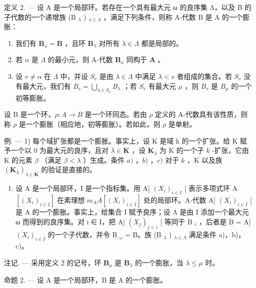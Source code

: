 定义 2. --- 设 A 是一个局部环。若存在一个具有最大元 ω 的良序集 Λ，以及 B 的子代数的一个递增族 (B \(_{λ}\) ) \(_{λ∈Λ}\) ，满足下列条件，则称 A-代数 B 是 A 的一个膨胀：

\begin{enumerate}
\def\labelenumi{\alph{enumi})}
\item
  我们有 \(\mathbf{B}_{\omega} = \mathbf{B}\) ，且环 \(\mathbf{B}_{\lambda}\) 对所有 \(\lambda \in \Lambda\) 都是局部的。
\item
  若 \(\alpha\) 是 \(\Lambda\) 的最小元，则 A-代数 \(\mathbf{B}_{\alpha}\) 同构于 \(\mathbf{A}\) 。
\item
  设 \(v \neq \alpha\) 在 \(\Lambda\) 中，并设 \(S_{v}\) 是由 \(\lambda \in \Lambda\) 中满足 \(\lambda < v\) 者组成的集合。若 \(S_{v}\) 没有最大元，我们有 \(B_{v} = \bigcup_{\lambda \in S_{v}} B_{\lambda}\) ；若 \(S_{v}\) 有最大元 \(\mu\) ，则 \(B_{v}\) 是 \(B_{\mu}\) 的一个初等膨胀。
\end{enumerate}

设 B 是一个环，\(\rho: A \to B\) 是一个环同态。若由 \(\rho\) 定义的 A-代数具有该性质，则称 \(\rho\) 是一个膨胀（相应地，初等膨胀）。若如此，则 \(\rho\) 是单射。

例. --- 1) 每个域扩张都是一个膨胀。事实上，设 K 是域 k 的一个扩张。给 K 赋予一个以 0 为最大元的良序，且对 \(\lambda \in \mathbf{K}\) ，设 \(\mathbf{K}_{\lambda}\) 为 K 的一个子 \(k\) -扩张，它由 K 的元素 \(\beta\) （满足 \(\beta < \lambda\) ）生成。条件 \(a)\) ，\(b)\) ，\(c)\) 对于 \(k\) ，K 以及族 \((\mathbf{K}_{\lambda})_{\lambda \in \mathbf{K}}\) 的验证是直接的。

\begin{enumerate}
\def\labelenumi{\arabic{enumi})}
\setcounter{enumi}{1}
\tightlist
\item
  设 A 是一个局部环，I 是一个指标集。用 A{]} \((X_{i})_{i\in I}\) {[} 表示多项式环 A \([(X_{i})_{i\in I}]\) 在素理想 \(m_{A}A[(X_{i})_{i\in I}]\) 处的局部环。A-代数 A{]} \((X_{i})_{i\in I}\) {[} 是 A 的一个膨胀。事实上，给集合 I 赋予良序；设 Λ 是由 I 添加一个最大元 ω 而得到的良序集。对 i ∈ I，把 A{]} \((X_{j})_{j<i}\) {[} 等同于 B \(_{i}\) ，后者是 B = A{]} \((X_{i})_{i\in I}\) 的一个子代数，并令 B \(_{\omega}\) = B。族 (B \(_{\lambda}\) ) \(_{\lambda\in\Lambda}\) 满足条件 a)，b)，c)。
\end{enumerate}

注记. --- 采用定义 2 的记号，环 \(\mathbf{B}_{\mu}\) 是 \(\mathbf{B}_{\lambda}\) 的一个膨胀，当 \(\lambda \leqslant \mu\) 时。

命题 2. --- 设 A 是一个局部环，B 是 A 的一个膨胀。

